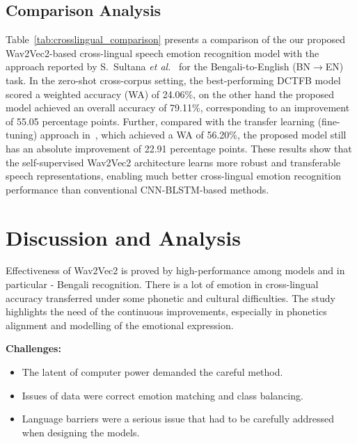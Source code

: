 \documentclass[conference]{IEEEtran}
\begin{document}
\subsection{Comparison Analysis}
Table~\ref{tab:crosslingual_comparison} presents a comparison of the our proposed Wav2Vec2-based cross-lingual speech emotion recognition model with the approach reported by S.~Sultana \textit{et al.}~\cite{sultana2022} for the Bengali-to-English (BN$\rightarrow$EN) task. In the zero-shot cross-corpus setting, the best-performing DCTFB model scored a weighted accuracy (WA) of 24.06\%, on the other hand the proposed model achieved an overall accuracy of 79.11\%, corresponding to an improvement of 55.05 percentage points. Further, compared with the transfer learning (fine-tuning) approach in~\cite{sultana2022}, which achieved a WA of 56.20\%, the proposed model still has an absolute improvement of 22.91 percentage points. These results show that the self-supervised Wav2Vec2 architecture learns more robust and transferable speech representations, enabling much better cross-lingual emotion recognition performance than conventional CNN-BLSTM-based methods.

\section{Discussion and Analysis}

Effectiveness of Wav2Vec2 is proved by high-performance among models and in particular - Bengali recognition. There is a lot of emotion in cross-lingual accuracy
transferred under some phonetic and cultural difficulties. The study highlights the need of the continuous improvements, especially in phonetics alignment and modelling of the emotional expression.

\smallskip
\noindent\textbf{Challenges:}
\begin{itemize}
  \item The latent of computer power demanded the careful method.
  \item Issues of data were correct emotion matching and class balancing.
  \item Language barriers were a serious issue that had to be carefully addressed when designing the models.
\end{itemize}
\end{document}
